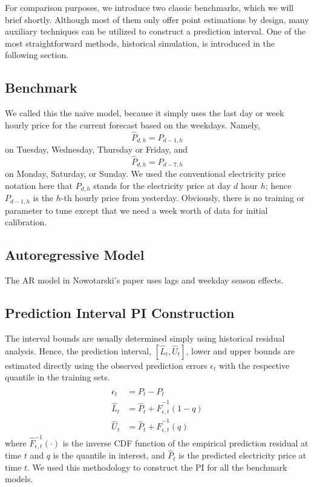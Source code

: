 \documentclass[11pt, letterpaper, journal]{IEEEtran}
\begin{document}
For comparison purposes, we introduce two classic benchmarks, which we will brief shortly. Although most of them only offer point estimations by design, many auxiliary techniques can be utilized to construct a prediction interval. One of the most straightforward methods, historical simulation, is introduced in the following section. 

\subsection{Benchmark}
We called this the naive model, because it simply uses the last day or week hourly price for the current forecast based on the weekdays. Namely, $$\hat{P}_{d,h} = P_{d-1, h}$$ on Tuesday, Wednesday, Thursday or Friday, and $$\hat{P}_{d,h} = P_{d-7, h}$$ on Monday, Saturday, or Sunday. We used the conventional electricity price notation here that $P_{d,h}$ stands for the electricity price at day $d$ hour $h$; hence $P_{d-1, h}$ is the $h$-th hourly price from yesterday. Obviously, there is no training or parameter to tune except that we need a week worth of data for initial calibration.

\subsection{Autoregressive Model}
The AR model in Nowotarski's paper uses lags and weekday season effects.

\subsection{Prediction Interval {PI} Construction}
The interval bounds are usually determined simply using historical residual analysis. Hence, the prediction interval, $[\hat{L}_t, \hat{U}_t]$, lower and upper bounds are estimated directly using the observed prediction errors $\epsilon_t$ with the respective quantile in the training sets. 
\begin{align*}
    \epsilon_t &= P_t - \hat{P}_t \\
    \hat{L}_t &= \hat{P}_t + \hat{F}^{-1}_{\epsilon, t}(1-q) \\
    \hat{U}_t &= \hat{P}_t + \hat{F}^{-1}_{\epsilon, t}(q)
\end{align*}
where $\hat{F}^{-1}_{\epsilon, t}(\cdot)$ is the inverse CDF function of the empirical prediction residual at time $t$ and $q$ is the quantile in interest, and $\hat{P}_t$ is the predicted electricity price at time $t$. We used this methodology to construct the PI for all the benchmark models.
\end{document}
